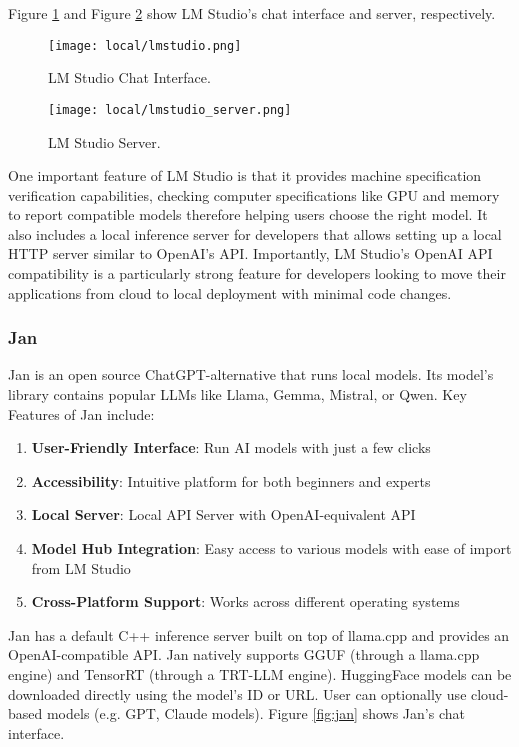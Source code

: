 Figure \ref{fig:lmstudio} and Figure \ref{fig:lmstudio_server} show LM Studio's chat interface and server, respectively.

\begin{figure}[H]
\centering
\texttt{[image: local/lmstudio.png]}
\caption{LM Studio Chat Interface.}
\label{fig:lmstudio}
\end{figure}

\begin{figure}[H]
\centering
\texttt{[image: local/lmstudio\_server.png]}
\caption{LM Studio Server.}
\label{fig:lmstudio_server}
\end{figure}

One important feature of LM Studio is that it provides machine specification verification capabilities, checking computer specifications like GPU and memory to report compatible models therefore helping users choose the right model. It also includes a local inference server for developers that allows setting up a local HTTP server similar to OpenAI's API. Importantly, LM Studio's OpenAI API compatibility is a particularly strong feature for developers looking to move their applications from cloud to local deployment with minimal code changes.

\subsubsection{Jan}

Jan is an open source ChatGPT-alternative that runs local models. Its model's library contains popular LLMs like Llama, Gemma, Mistral, or Qwen. Key Features of Jan include:

\begin{enumerate}
\item \textbf{User-Friendly Interface}: Run AI models with just a few clicks
\item \textbf{Accessibility}: Intuitive platform for both beginners and experts
\item \textbf{Local Server}: Local API Server with OpenAI-equivalent API
\item \textbf{Model Hub Integration}: Easy access to various models with ease of import from LM Studio
\item \textbf{Cross-Platform Support}: Works across different operating systems
\end{enumerate}

Jan has a default C++ inference server built on top of llama.cpp and provides an OpenAI-compatible API. Jan natively supports GGUF (through a llama.cpp engine) and TensorRT (through a TRT-LLM engine). HuggingFace models can be downloaded directly using the model's ID or URL. User can optionally use cloud-based models (e.g. GPT, Claude models). Figure \ref{fig:jan} shows Jan's chat interface.

